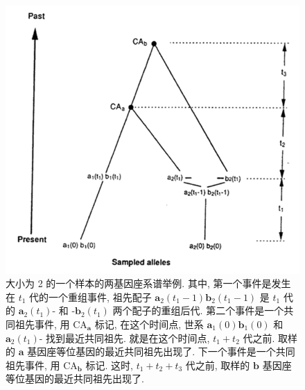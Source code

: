 \documentclass[12pt]{article}
\begin{document}
\begin{figure}
    \centering
    \includegraphics{coalescent-process.images/image3.png}
    \caption{大小为 2 的一个样本的两基因座系谱举例. 其中, 第一个事件是发生在 $t_{1}$ 代的一个重组事件, 祖先配子
        $\mathbf{a}_{2}(t_{1}-1)\mathbf{b}_{2}(t_{1}-1)$ 是 $t_{1}$ 代的 $\mathbf{a}_{2}(t_{1})\text{-}$ 和
        $\text{-}\mathbf{b}_{2}(t_{1})$ 两个配子的重组后代. 第二个事件是一个共同祖先事件, 用 $\text{CA}_{\mathbf{a}}$
        标记, 在这个时间点, 世系 $\mathbf{a}_{1}(0)\mathbf{b}_{1}(0)$ 和 $\mathbf{a}_{2}(t_{1})\text{-}$
        找到最近共同祖先. 就是在这个时间点, $t_{1}+t_{2}$ 代之前. 取样的 $\mathbf{a}$ 基因座等位基因的最近共同祖先出现了.
        下一个事件是一个共同祖先事件, 用 $\text{CA}_{\mathbf{b}}$ 标记. 这时, $t_{1}+t_{2}+t_{3}$ 代之前, 取样的
        $\mathbf{b}$ 基因座等位基因的最近共同祖先出现了.}
    \label{fig:3}
\end{figure}
\end{document}
